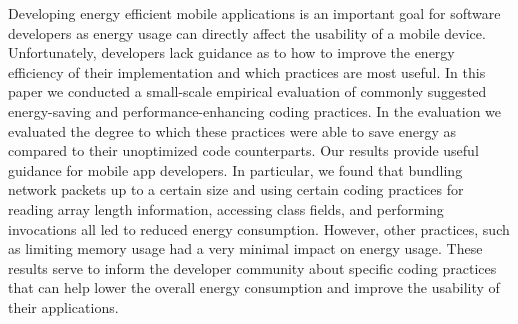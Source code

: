 \documentclass{article}
\begin{document}
\medskip

Developing energy efficient mobile applications is an important goal for software developers as energy usage can directly affect the usability of a mobile device. Unfortunately,
developers lack guidance as to how to improve the energy
efficiency of their implementation and which practices are
most useful. In this paper we conducted a small-scale empirical evaluation of commonly suggested energy-saving and
performance-enhancing coding practices. In the evaluation
we evaluated the degree to which these practices were able
to save energy as compared to their unoptimized code counterparts. Our results provide useful guidance for mobile app
developers. In particular, we found that bundling network
packets up to a certain size and using certain coding practices for reading array length information, accessing class
fields, and performing invocations all led to reduced energy
consumption. However, other practices, such as limiting
memory usage had a very minimal impact on energy usage. These results serve to inform the developer community
about specific coding practices that can help lower the overall energy consumption and improve the usability of their
applications. \cite{li2014investigation}




\printbibliography
\end{document}

